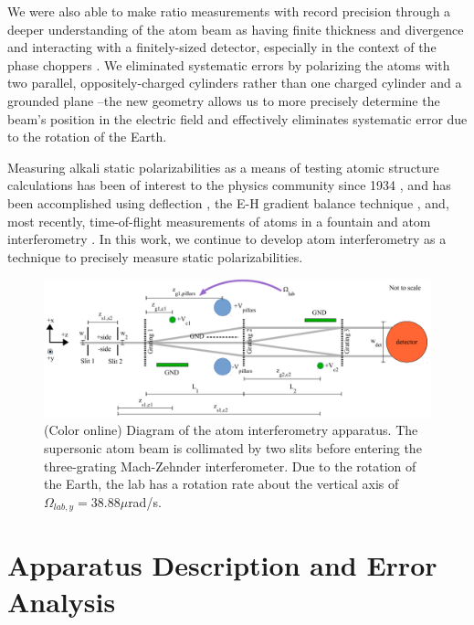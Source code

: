 \documentclass[twocolumn,prl,showpacs,superscriptaddress]{revtex4-1}   %
\begin{document}
We were also able to make ratio measurements with record precision through a deeper understanding of the atom beam as having finite thickness and divergence and interacting with a finitely-sized detector, especially in the context of the phase choppers \cite{Hromada2014}. We eliminated systematic errors by polarizing the atoms with two parallel, oppositely-charged cylinders rather than one charged cylinder and a grounded plane \cite{Holmgren2010}--the new geometry allows us to more precisely determine the beam's position in the electric field and effectively eliminates systematic error due to the rotation of the Earth.


Measuring alkali static polarizabilities as a means of testing atomic 
structure calculations has been of interest to the physics community since
1934 \cite{Scheffers1934}, and has been
accomplished using deflection \cite{Scheffers1934,Chamberlain1963,Hall1974}, the E-H gradient
balance technique \cite{Salop1961,Molof1974}, and, most recently, time-of-flight measurements of atoms in a fountain \cite{Amini2003} and atom interferometry 
\cite{Ekstrom1995,Miffre2006,Holmgren2010}. In this work, we continue to develop atom interferometry as a technique to precisely measure static polarizabilities.

\begin{figure}
\includegraphics[width=\linewidth,keepaspectratio]{IFM_diagram1.pdf}
\caption{\label{IFMDiagram}(Color online) Diagram of the atom interferometry apparatus. The supersonic atom beam is collimated by two slits before entering the three-grating Mach-Zehnder interferometer. Due to the rotation of the Earth, the lab has a rotation rate about the vertical axis of $\Omega_{lab,y} = 38.88\mu$rad/s. }
\end{figure}

\section{Apparatus Description and Error Analysis}
\end{document}
